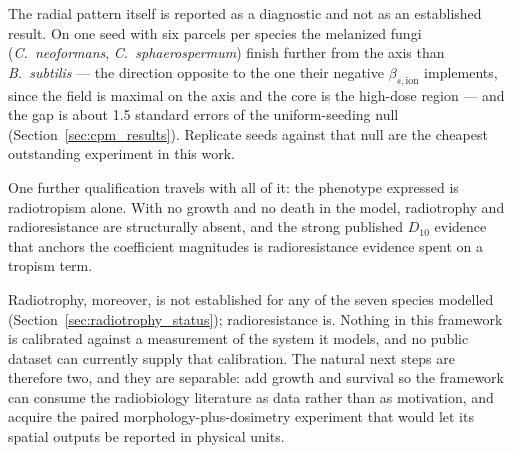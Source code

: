 \documentclass[11pt]{article}
\begin{document}
The radial pattern itself is reported as a diagnostic and not as an established result. On one seed
with six parcels per species the melanized fungi (\textit{C.\ neoformans},
\textit{C.\ sphaerospermum}) finish further from the axis than \textit{B.\ subtilis} --- the
direction opposite to the one their negative $\beta_{s,\mathrm{ion}}$ implements, since the field is
maximal on the axis and the core is the high-dose region --- and the gap is about 1.5 standard
errors of the uniform-seeding null (Section~\ref{sec:cpm_results}). Replicate seeds against that
null are the cheapest outstanding experiment in this work.

One further qualification travels with all of it: the phenotype expressed is radiotropism alone.
With no growth and no death in the model, radiotrophy and radioresistance are structurally absent,
and the strong published $D_{10}$ evidence that anchors the coefficient magnitudes is
radioresistance evidence spent on a tropism term.

Radiotrophy, moreover, is not established for any of the seven species modelled
(Section~\ref{sec:radiotrophy_status}); radioresistance is. Nothing in this framework is calibrated
against a measurement of the system it models, and no public dataset can currently supply that
calibration. The natural next steps are therefore two, and they are separable: add growth and
survival so the framework can consume the radiobiology literature as data rather than as
motivation, and acquire the paired morphology-plus-dosimetry experiment that would let its spatial
outputs be reported in physical units.
\end{document}
